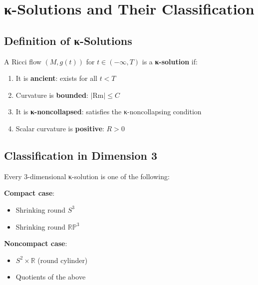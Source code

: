 \chapter{κ-Solutions and Their Classification}
\label{chap:kappa_solutions}

\section{Definition of κ-Solutions}

\begin{definition}[κ-Solution]
\label{def:kappa_solution}
A Ricci flow $(M, g(t))$ for $t \in (-\infty, T)$ is a \textbf{κ-solution} if:
\begin{enumerate}
\item It is \textbf{ancient}: exists for all $t < T$
\item Curvature is \textbf{bounded}: $|\text{Rm}| \leq C$ 
\item It is \textbf{κ-noncollapsed}: satisfies the κ-noncollapsing condition
\item Scalar curvature is \textbf{positive}: $R > 0$
\end{enumerate}
\end{definition}

\section{Classification in Dimension 3}

\begin{theorem}
\label{thm:kappa_classification}
Every 3-dimensional κ-solution is one of the following:

\textbf{Compact case}:
\begin{itemize}
\item Shrinking round $S^3$
\item Shrinking round $\mathbb{RP}^3$
\end{itemize}

\textbf{Noncompact case}:
\begin{itemize}
\item $S^2 \times \mathbb{R}$ (round cylinder)
\item Quotients of the above
\end{itemize}
\end{theorem}

